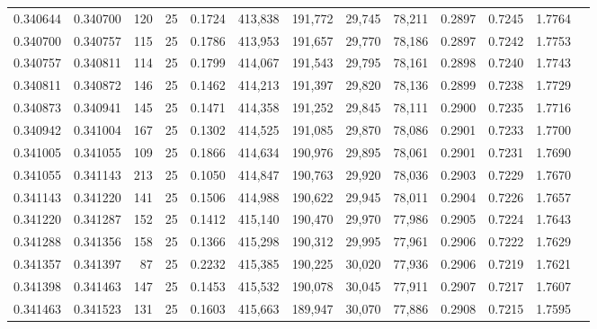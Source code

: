 \begin{tabular}{rrrrrrrrrrrrr}
0.340644 & 0.340700 &   120 &  25 &                                     0.1724 & 413,838 & 191,772 &  29,745 &  78,211 & 0.2897 & 0.7245 & 1.7764 \\
0.340700 & 0.340757 &   115 &  25 &                                     0.1786 & 413,953 & 191,657 &  29,770 &  78,186 & 0.2897 & 0.7242 & 1.7753 \\
0.340757 & 0.340811 &   114 &  25 &                                     0.1799 & 414,067 & 191,543 &  29,795 &  78,161 & 0.2898 & 0.7240 & 1.7743 \\
0.340811 & 0.340872 &   146 &  25 &                                     0.1462 & 414,213 & 191,397 &  29,820 &  78,136 & 0.2899 & 0.7238 & 1.7729 \\
0.340873 & 0.340941 &   145 &  25 &                                     0.1471 & 414,358 & 191,252 &  29,845 &  78,111 & 0.2900 & 0.7235 & 1.7716 \\
0.340942 & 0.341004 &   167 &  25 &                                     0.1302 & 414,525 & 191,085 &  29,870 &  78,086 & 0.2901 & 0.7233 & 1.7700 \\
0.341005 & 0.341055 &   109 &  25 &                                     0.1866 & 414,634 & 190,976 &  29,895 &  78,061 & 0.2901 & 0.7231 & 1.7690 \\
0.341055 & 0.341143 &   213 &  25 &                                     0.1050 & 414,847 & 190,763 &  29,920 &  78,036 & 0.2903 & 0.7229 & 1.7670 \\
0.341143 & 0.341220 &   141 &  25 &                                     0.1506 & 414,988 & 190,622 &  29,945 &  78,011 & 0.2904 & 0.7226 & 1.7657 \\
0.341220 & 0.341287 &   152 &  25 &                                     0.1412 & 415,140 & 190,470 &  29,970 &  77,986 & 0.2905 & 0.7224 & 1.7643 \\
0.341288 & 0.341356 &   158 &  25 &                                     0.1366 & 415,298 & 190,312 &  29,995 &  77,961 & 0.2906 & 0.7222 & 1.7629 \\
0.341357 & 0.341397 &    87 &  25 &                                     0.2232 & 415,385 & 190,225 &  30,020 &  77,936 & 0.2906 & 0.7219 & 1.7621 \\
0.341398 & 0.341463 &   147 &  25 &                                     0.1453 & 415,532 & 190,078 &  30,045 &  77,911 & 0.2907 & 0.7217 & 1.7607 \\
0.341463 & 0.341523 &   131 &  25 &                                     0.1603 & 415,663 & 189,947 &  30,070 &  77,886 & 0.2908 & 0.7215 & 1.7595 \\

\end{tabular}
